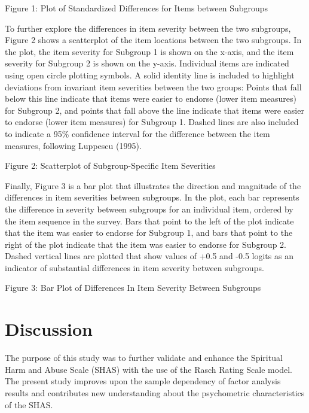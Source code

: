 \documentclass[
  letterpaper,
  DIV=11,
  numbers=noendperiod]{scrreport}
\begin{document}
Figure 1: Plot of Standardized Differences for Items between Subgroups

To further explore the differences in item severity between the two
subgroups, Figure 2 shows a scatterplot of the item locations between
the two subgroups. In the plot, the item severity for Subgroup 1 is
shown on the x-axis, and the item severity for Subgroup 2 is shown on
the y-axis. Individual items are indicated using open circle plotting
symbols. A solid identity line is included to highlight deviations from
invariant item severities between the two groups: Points that fall below
this line indicate that items were easier to endorse (lower item
measures) for Subgroup 2, and points that fall above the line indicate
that items were easier to endorse (lower item measures) for Subgroup 1.
Dashed lines are also included to indicate a 95\% confidence interval
for the difference between the item measures, following Luppescu (1995).

Figure 2: Scatterplot of Subgroup-Specific Item Severities

Finally, Figure 3 is a bar plot that illustrates the direction and
magnitude of the differences in item severities between subgroups. In
the plot, each bar represents the difference in severity between
subgroups for an individual item, ordered by the item sequence in the
survey. Bars that point to the left of the plot indicate that the item
was easier to endorse for Subgroup 1, and bars that point to the right
of the plot indicate that the item was easier to endorse for Subgroup 2.
Dashed vertical lines are plotted that show values of +0.5 and -0.5
logits as an indicator of substantial differences in item severity
between subgroups.

Figure 3: Bar Plot of Differences In Item Severity Between Subgroups


\hypertarget{discussion}{%
\chapter*{Discussion}\label{discussion}}

The purpose of this study was to further validate and enhance the
Spiritual Harm and Abuse Scale (SHAS) with the use of the Rasch Rating
Scale model. The present study improves upon the sample dependency of
factor analysis results and contributes new understanding about the
psychometric characteristics of the SHAS.
\end{document}
